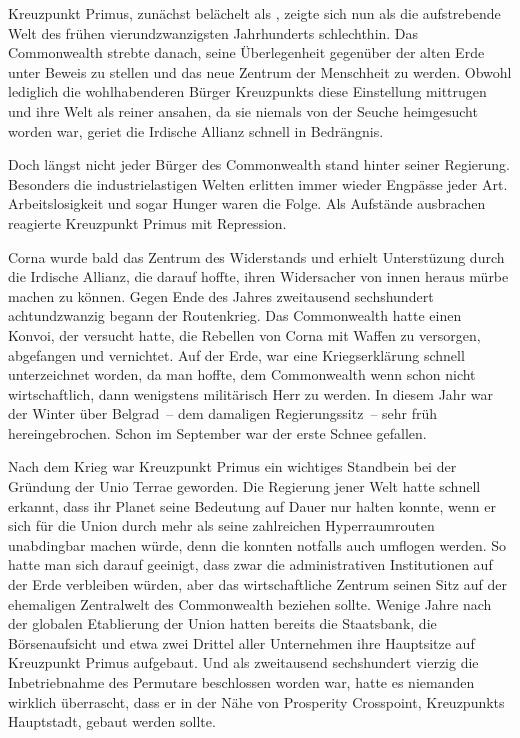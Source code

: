\par

Kreuzpunkt Primus, zunächst belächelt als , zeigte sich nun als die aufstrebende Welt des frühen vierundzwanzigsten Jahrhunderts schlechthin. Das Commonwealth strebte danach, seine Überlegenheit gegenüber der alten Erde unter Beweis zu stellen und das neue Zentrum der Menschheit zu werden. Obwohl lediglich die wohlhabenderen Bürger Kreuzpunkts diese Einstellung mittrugen und ihre Welt als reiner ansahen, da sie niemals von der Seuche heimgesucht worden war, geriet die Irdische Allianz schnell in Bedrängnis.

\par

Doch längst nicht jeder Bürger des Commonwealth stand hinter seiner Regierung. Besonders die industrielastigen Welten erlitten immer wieder Engpässe jeder Art. Arbeitslosigkeit und sogar Hunger waren die Folge. Als Aufstände ausbrachen reagierte Kreuzpunkt Primus mit Repression.

\par

Corna wurde bald das Zentrum des Widerstands und erhielt Unterstüzung durch die Irdische Allianz, die darauf hoffte, ihren Widersacher von innen heraus mürbe machen zu können. Gegen Ende des Jahres zweitausend sechshundert achtundzwanzig begann der Routenkrieg. Das Commonwealth hatte einen Konvoi, der versucht hatte, die Rebellen von Corna mit Waffen zu versorgen, abgefangen und vernichtet. Auf der Erde, war eine Kriegserklärung schnell unterzeichnet worden, da man hoffte, dem Commonwealth wenn schon nicht wirtschaftlich, dann wenigstens militärisch Herr zu werden. In diesem Jahr war der Winter über Belgrad~-- dem damaligen Regierungssitz~-- sehr früh hereingebrochen. Schon im September war der erste Schnee gefallen.

\par

Nach dem Krieg war Kreuzpunkt Primus ein wichtiges Standbein bei der Gründung der Unio Terrae geworden. Die Regierung jener Welt hatte schnell erkannt, dass ihr Planet seine Bedeutung auf Dauer nur halten konnte, wenn er sich für die Union durch mehr als seine zahlreichen Hyperraumrouten unabdingbar machen würde, denn die konnten notfalls auch umflogen werden. So hatte man sich darauf geeinigt, dass zwar die administrativen Institutionen auf der Erde verbleiben würden, aber das wirtschaftliche Zentrum seinen Sitz auf der ehemaligen Zentralwelt des Commonwealth beziehen sollte. Wenige Jahre nach der globalen Etablierung der Union hatten bereits die Staatsbank, die Börsenaufsicht und etwa zwei Drittel aller Unternehmen ihre Hauptsitze auf Kreuzpunkt Primus aufgebaut. Und als zweitausend sechshundert vierzig die Inbetriebnahme des Permutare beschlossen worden war, hatte es niemanden wirklich überrascht, dass er in der Nähe von Prosperity Crosspoint, Kreuzpunkts Hauptstadt, gebaut werden sollte.

